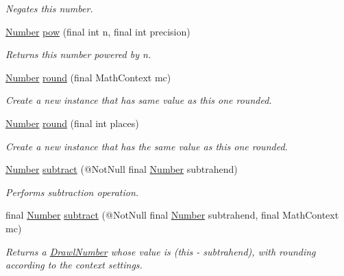 \begin{DoxyCompactItemize}
\begin{DoxyCompactList}\small\item\em Negates this number. \end{DoxyCompactList}\item 
\hyperlink{interfacecom_1_1aarrelaakso_1_1drawl_1_1_number}{Number} \hyperlink{classcom_1_1aarrelaakso_1_1drawl_1_1_drawl_number_a13f1ea57cce88e852cd7e01b0b3e8cf2}{pow} (final int n, final int precision)
\begin{DoxyCompactList}\small\item\em Returns this number powered by n. \end{DoxyCompactList}\item 
\hyperlink{interfacecom_1_1aarrelaakso_1_1drawl_1_1_number}{Number} \hyperlink{classcom_1_1aarrelaakso_1_1drawl_1_1_drawl_number_aec6cdb055d029b375d5dc72f87926a11}{round} (final Math\+Context mc)
\begin{DoxyCompactList}\small\item\em Create a new instance that has same value as this one rounded. \end{DoxyCompactList}\item 
\hyperlink{interfacecom_1_1aarrelaakso_1_1drawl_1_1_number}{Number} \hyperlink{classcom_1_1aarrelaakso_1_1drawl_1_1_drawl_number_a9755cb62f7e9df1377379aa6781b8de0}{round} (final int places)
\begin{DoxyCompactList}\small\item\em Create a new instance that has the same value as this one rounded. \end{DoxyCompactList}\item 
\hyperlink{interfacecom_1_1aarrelaakso_1_1drawl_1_1_number}{Number} \hyperlink{classcom_1_1aarrelaakso_1_1drawl_1_1_drawl_number_ab5072a1d6694648646b386c3f7e65b0e}{subtract} (@Not\+Null final \hyperlink{interfacecom_1_1aarrelaakso_1_1drawl_1_1_number}{Number} subtrahend)
\begin{DoxyCompactList}\small\item\em Performs subtraction operation. \end{DoxyCompactList}\item 
final \hyperlink{interfacecom_1_1aarrelaakso_1_1drawl_1_1_number}{Number} \hyperlink{classcom_1_1aarrelaakso_1_1drawl_1_1_drawl_number_aaf0d1f797d24144d3ec2dba861217cb9}{subtract} (@Not\+Null final \hyperlink{interfacecom_1_1aarrelaakso_1_1drawl_1_1_number}{Number} subtrahend, final Math\+Context mc)
\begin{DoxyCompactList}\small\item\em Returns a \hyperlink{classcom_1_1aarrelaakso_1_1drawl_1_1_drawl_number}{Drawl\+Number} whose value is (this -\/ subtrahend), with rounding according to the context settings. \end{DoxyCompactList}\item 

\end{DoxyCompactItemize}
